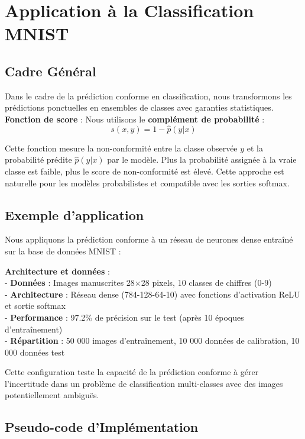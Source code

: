\documentclass[a4paper,12pt]{article}
\begin{document}
\section{Application à la Classification MNIST}

\subsection{Cadre Général}

Dans le cadre de la prédiction conforme en classification, nous transformons les prédictions ponctuelles en ensembles de classes avec garanties statistiques. \\

\textbf{Fonction de score} : Nous utilisons le \textbf{complément de probabilité} :
$$s(x, y) = 1 - \hat{p}(y|x)$$

Cette fonction mesure la non-conformité entre la classe observée $y$ et la probabilité prédite $\hat{p}(y|x)$ par le modèle. Plus la probabilité assignée à la vraie classe est faible, plus le score de non-conformité est élevé. Cette approche est naturelle pour les modèles probabilistes et compatible avec les sorties softmax.

\subsection{Exemple d'application}

Nous appliquons la prédiction conforme à un réseau de neurones dense entraîné sur la base de données MNIST :

\textbf{Architecture et données} : \\
- \textbf{Données} : Images manuscrites 28×28 pixels, 10 classes de chiffres (0-9) \\
- \textbf{Architecture} : Réseau dense (784-128-64-10) avec fonctions d'activation ReLU et sortie softmax \\
- \textbf{Performance} : 97.2\% de précision sur le test (après 10 époques d'entraînement)\\
- \textbf{Répartition} : 50 000 images d'entraînement, 10 000 données de calibration, 10 000 données test

Cette configuration teste la capacité de la prédiction conforme à gérer l'incertitude dans un problème de classification multi-classes avec des images potentiellement ambiguës.

\subsection{Pseudo-code d'Implémentation}
\end{document}
